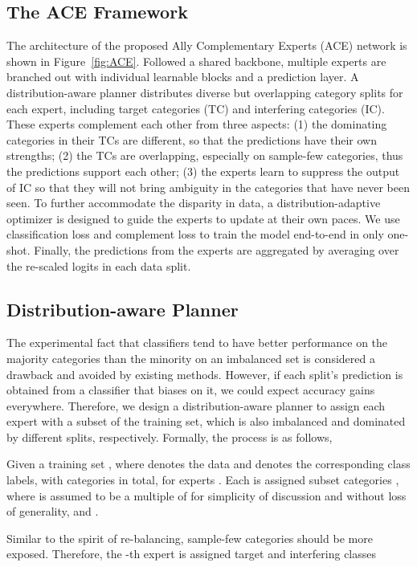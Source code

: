 \documentclass[10pt,twocolumn,letterpaper]{article}
\begin{document}
\subsection{The ACE Framework}
The architecture of the proposed Ally Complementary Experts (ACE) network is shown in Figure~\ref{fig:ACE}. 
Followed a shared backbone, multiple experts are branched out with individual learnable blocks and a prediction layer. A distribution-aware planner distributes diverse but overlapping category splits for each expert, including target categories (TC) and interfering categories (IC). These experts complement each other from three aspects: (1) the dominating categories in their TCs are different, so that the predictions have their own strengths; (2) the TCs are overlapping, especially on sample-few categories, thus the predictions support each other; (3) the experts learn to suppress the output of IC so that they will not bring ambiguity in the categories that have never been seen. To further accommodate the disparity in data, a distribution-adaptive optimizer is designed to guide the experts to update at their own paces. We use classification loss  and complement loss  to train the model end-to-end in only one-shot. Finally, the predictions from the experts are aggregated by averaging over the re-scaled logits in each data split.

\subsection{Distribution-aware Planner}
The experimental fact that classifiers tend to have better performance on the majority categories than the minority on an imbalanced set is considered a drawback and avoided by existing methods. However, if each split’s prediction is obtained from a classifier that biases on it, we could expect accuracy gains everywhere. Therefore, we design a distribution-aware planner to assign each expert with a subset of the training set, which is also imbalanced and dominated by different splits, respectively. Formally, the process is as follows,

Given a training set , where  denotes the data and  denotes the corresponding class labels, with  categories in total, for  experts . Each  is assigned subset categories , where  is assumed to be a multiple of  for simplicity of discussion and without loss of generality,  and . 

Similar to the spirit of re-balancing, sample-few categories should be more exposed. Therefore, the -th expert  is assigned target  and interfering classes 
\end{document}
